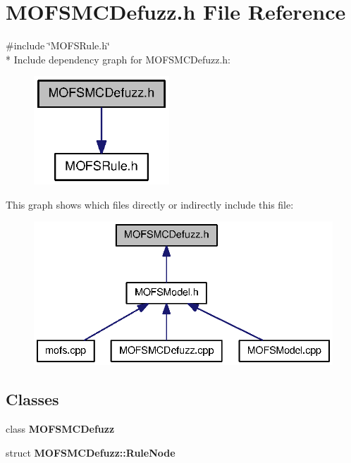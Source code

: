 \section{M\-O\-F\-S\-M\-C\-Defuzz.\-h File Reference}
\label{MOFSMCDefuzz_8h}
{\ttfamily \#include \char`\"{}M\-O\-F\-S\-Rule.\-h\char`\"{}}\\*
Include dependency graph for M\-O\-F\-S\-M\-C\-Defuzz.\-h\-:\nopagebreak
\begin{figure}[H]
\begin{center}
\leavevmode
\includegraphics[width=144pt]{MOFSMCDefuzz_8h__incl}
\end{center}
\end{figure}
This graph shows which files directly or indirectly include this file\-:\nopagebreak
\begin{figure}[H]
\begin{center}
\leavevmode
\includegraphics[width=336pt]{MOFSMCDefuzz_8h__dep__incl}
\end{center}
\end{figure}
\subsection*{Classes}
\begin{DoxyCompactItemize}
\item 
class {\bf M\-O\-F\-S\-M\-C\-Defuzz}
\item 
struct {\bf M\-O\-F\-S\-M\-C\-Defuzz\-::\-Rule\-Node}
\end{DoxyCompactItemize}
